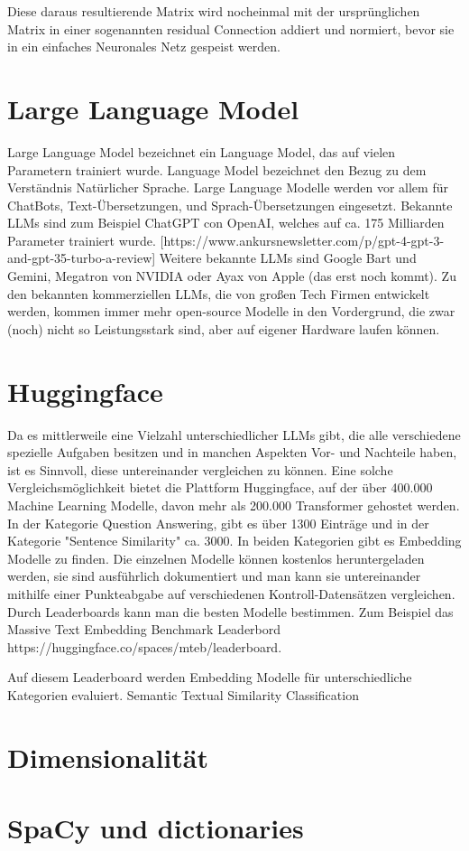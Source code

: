 Diese daraus resultierende Matrix wird nocheinmal mit der ursprünglichen Matrix in einer sogenannten residual Connection addiert und normiert, bevor sie in ein einfaches Neuronales Netz gespeist werden.

\section{Large Language Model}

Large Language Model bezeichnet ein Language Model, das auf vielen Parametern trainiert wurde. 
Language Model bezeichnet den Bezug zu dem Verständnis Natürlicher Sprache.
Large Language Modelle werden vor allem für ChatBots, Text-Übersetzungen, und Sprach-Übersetzungen eingesetzt.
Bekannte LLMs sind zum Beispiel ChatGPT con OpenAI, welches auf ca. 175 Milliarden Parameter trainiert wurde. [https://www.ankursnewsletter.com/p/gpt-4-gpt-3-and-gpt-35-turbo-a-review]
Weitere bekannte LLMs sind Google Bart und Gemini, Megatron von NVIDIA oder Ayax von Apple (das erst noch kommt).
Zu den bekannten kommerziellen LLMs, die von großen Tech Firmen entwickelt werden, kommen immer mehr open-source Modelle in den Vordergrund, die zwar (noch) nicht so Leistungsstark sind, aber auf eigener Hardware laufen können.



\section{Huggingface}

Da es mittlerweile eine Vielzahl unterschiedlicher LLMs gibt, die alle verschiedene spezielle Aufgaben besitzen und in manchen Aspekten Vor- und Nachteile haben, ist es Sinnvoll, diese untereinander vergleichen zu können.
Eine solche Vergleichsmöglichkeit bietet die Plattform Huggingface, auf der über 400.000 Machine Learning Modelle, davon mehr als 200.000 Transformer gehostet werden.
In der Kategorie Question Answering, gibt es über 1300 Einträge und in der Kategorie "Sentence Similarity" ca. 3000.
In beiden Kategorien gibt es Embedding Modelle zu finden.
Die einzelnen Modelle können  kostenlos heruntergeladen werden, sie sind ausführlich dokumentiert und man kann sie untereinander mithilfe einer Punkteabgabe auf verschiedenen Kontroll-Datensätzen vergleichen.
Durch Leaderboards kann man die besten Modelle bestimmen.
Zum Beispiel das Massive Text Embedding Benchmark Leaderbord https://huggingface.co/spaces/mteb/leaderboard.\cite{muennighoff2023}

Auf diesem Leaderboard werden Embedding Modelle für unterschiedliche Kategorien evaluiert.
Semantic Textual Similarity 
Classification






\section{Dimensionalität}

\section{SpaCy und dictionaries}
